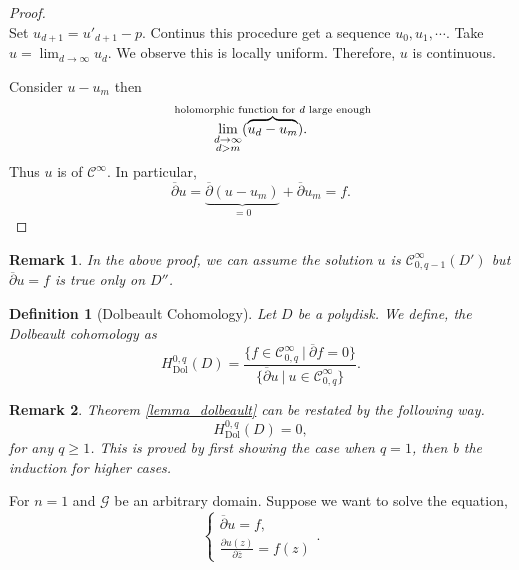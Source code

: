 \documentclass{article}
\newtheorem{definition}{Definition}[section]
\newtheorem{remark}{Remark}[section]
\DeclareMathOperator{\Dol}{Dol}
\newcommand{\G}[0]{\mathcal{G}}
\newcommand{\sep}[0]{\:|\:}
\newcommand{\pd}[2]{{\frac {\partial#1} {\partial#2}}}
\newcommand{\cz}[0]{\overline{z}}
\newcommand{\cpd}[0]{\overline{\partial}}
\newcommand{\ck}[1]{\mathcal{C}^{#1}}
\newcommand{\cinf}[0]{\ck{\infty}}
\begin{document}
\begin{proof}
\begin{equation*}
\end{equation*}
Set $u_{d+1} = u'_{d+1}-p$. Continus this procedure get a sequence $u_0,u_1,\cdots$. Take $u= \lim_{d\to\infty}u_d$. We observe this is locally uniform. Therefore, $u$ is continuous.
\par Consider $u-u_m$ then 
\begin{equation*}
  \lim_{\substack{d\to\infty\\ d>m}}(\overbrace{u_d-u_m}^{\text{\makebox[0pt][c]{holomorphic function for $d$ large enough}}}).
\end{equation*}
Thus $u$ is of $\cinf$. In particular,
\begin{equation*}
  \cpd u = \underbrace{\cpd(u-u_m)}_{=0} +\cpd u_m = f.
\end{equation*}
\end{proof}

\begin{remark}
  In the above proof, we can assume the solution $u$ is $\mathcal{C}^\infty_{0,q-1}(D')$ but $\overline{\partial}u=f$ is true only on $D''$.
\end{remark}

\begin{definition}[Dolbeault Cohomology]
  Let $D$ be a polydisk. We define, the Dolbeault cohomology as
  \begin{equation*}
    H_{\Dol}^{0,q}(D) = {\frac {\{ f\in\cinf_{0,q}\sep \cpd f = 0\}} {\{\cpd u\sep u\in\cinf_{0,q}\}}}.
  \end{equation*}
\end{definition}


\begin{remark}
  Theorem \ref{lemma_dolbeault} can be restated by the following way.
  \begin{equation*}
    H^{0,q}_{\Dol}(D) = 0,
  \end{equation*}
  for any $q\geq1$. This is proved by first showing the case when $q=1$, then b the induction for higher cases.
\end{remark}

For $n=1$ and $\G$ be an arbitrary domain. Suppose we want to solve the equation,
\begin{equation*}
  \begin{cases}
    \cpd u = f,\\
    \pd{u(z)}{\cz} = f(z)
  \end{cases}.
\end{equation*}
\end{document}
